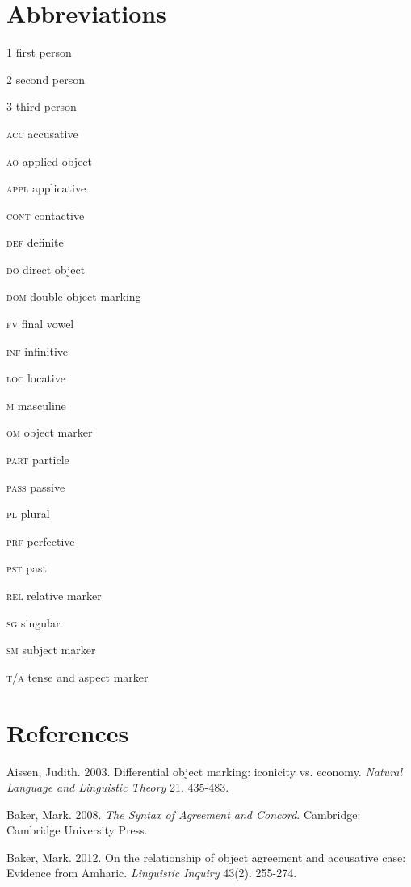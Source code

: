 \documentclass[output=paper]{langsci/langscibook}
\begin{document}
\section {Abbreviations}

{\textsc{1  }}{first person}

{\textsc{2  }}{second person}

{\textsc{3  }}{third person}

{\textsc{acc  }}{accusative}

{\textsc{ao  }}applied object

{\textsc{appl  }}{applicative}

{\textsc{cont}}  {contactive}

{\textsc{def  }}{definite}

{\textsc{do  }}direct object

\textsc{dom}  double object marking

{\textsc{fv  }}final vowel

{\textsc{inf  }}infinitive

{\textsc{loc}}  locative

{\textsc{m  }}masculine

{\textsc{om  }}object marker

{\textsc{part  }}particle

{\textsc{pass  }}passive

{\textsc{pl  }}plural

{\textsc{prf  }}perfective

{\textsc{pst  }}past

{\textsc{rel}}  relative marker

{\textsc{sg  }}singular

{\textsc{sm  }}subject marker

{\textsc{t}}/{\textsc{a  }}tense and aspect marker

\section {References}

Aissen, Judith. 2003. Differential object marking: iconicity vs. economy. {\textit{Natural Language and Linguistic Theory}} 21. 435-483.

Baker, Mark. 2008. {\textit{The Syntax of Agreement and Concord}}. Cambridge: Cambridge University Press.

Baker, Mark. 2012. On the relationship of object agreement and accusative case: Evidence from Amharic. {\textit{Linguistic Inquiry}} 43(2). 255-274.
\end{document}
